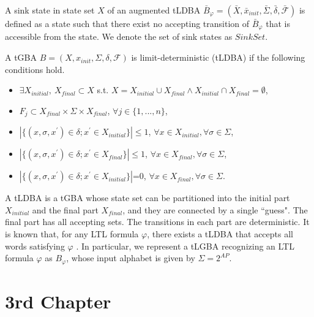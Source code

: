\documentclass[a4j,12pt,oneside,openany,english,dvipdfmx]{jsbook}
\begin{document}
\begin{definition}
A sink state in state set $X$ of an augmented tLDBA $\bar{B}_{\varphi} = (\bar{X}, \bar{x}_{init},\bar{\Sigma},\bar{\delta},\bar{\mathcal{F}})$ is defined as a state such that there exist no accepting transition of $\bar{B}_{\varphi}$ that is accessible from the state. We denote the set of sink states as $Sink Set$.
\end{definition}

\begin{definition}
  A tGBA $B = (X, x_{init},\Sigma,\delta,\mathcal{F})$ is limit-deterministic (tLDBA) if the following conditions hold.
  \begin{itemize}
    \item $\exists X_{initial},\ X_{final} \subset X$ s.t. $X=X_{initial} \cup X_{final} \land X_{initial} \cap X_{final} = \emptyset$,
    \item $F_j \subset X_{final} \times \Sigma \times X_{final}$, $\forall j \in \{ 1,...,n \}$,
    \item $| \{ (x, \sigma, x^{\prime}) \! \in \! \delta; x^{\prime} \! \in \! X_{initial} \} | \! \leq \! 1$, $\forall x \! \in \! X_{initial}, \forall \sigma \! \in \! \Sigma$,
    \item $| \{ (x, \sigma, x^{\prime}) \in \delta; x^{\prime} \in X_{final} \} | \! \leq \! 1$, $\forall x \! \in \! X_{final}, \forall \sigma \! \in \! \Sigma$,
    \item $| \{ (x, \sigma, x^{\prime}) \in \delta; x^{\prime} \in X_{initial} \} |$=0, $\forall x \! \in \! X_{final}, \forall \sigma \! \in \! \Sigma$.
  \end{itemize}
\end{definition}
A tLDBA is a tGBA whose state set can be partitioned into the initial part $X_{initial}$ and the final part $X_{final}$, and they are connected by a single ``guess". The final part has all accepting sets. The transitions in each part are deterministic.
It is known that, for any LTL formula $ \varphi $, there exists a tLDBA that accepts all words satisfying $\varphi$ \cite{SEJK2016}.
In particular, we represent a tLGBA recognizing an LTL formula $\varphi$ as $B_{\varphi}$, whose input alphabet is given by $ \Sigma = 2^{AP} $.

\chapter{3rd Chapter}
\end{document}
